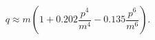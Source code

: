 \begin{equation}
\label{eq10}
q \approx m\left(1 + 0.202\frac{p^4}{m^4} -
0.135\frac{p^6}{m^6}\right).
\end{equation}

